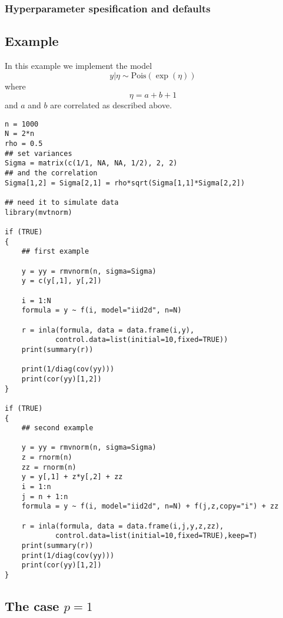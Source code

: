 \documentclass[a4paper,11pt]{article}
\begin{document}
\subsubsection*{Hyperparameter spesification and defaults}



\subsection*{Example}
In this example we implement the model
\begin{displaymath}
    y|\eta\sim\mbox{Pois}(\exp(\eta))
\end{displaymath}
where
\begin{displaymath}
    \eta=a+b+1
\end{displaymath}
and $a$ and $b$ are correlated as described above.

\begin{verbatim}
n = 1000
N = 2*n
rho = 0.5
## set variances
Sigma = matrix(c(1/1, NA, NA, 1/2), 2, 2)
## and the correlation
Sigma[1,2] = Sigma[2,1] = rho*sqrt(Sigma[1,1]*Sigma[2,2])

## need it to simulate data
library(mvtnorm)

if (TRUE)
{
    ## first example
    
    y = yy = rmvnorm(n, sigma=Sigma)
    y = c(y[,1], y[,2])

    i = 1:N
    formula = y ~ f(i, model="iid2d", n=N)

    r = inla(formula, data = data.frame(i,y),
            control.data=list(initial=10,fixed=TRUE))
    print(summary(r))

    print(1/diag(cov(yy)))
    print(cor(yy)[1,2])
}

if (TRUE)
{
    ## second example

    y = yy = rmvnorm(n, sigma=Sigma)
    z = rnorm(n)
    zz = rnorm(n)
    y = y[,1] + z*y[,2] + zz
    i = 1:n
    j = n + 1:n
    formula = y ~ f(i, model="iid2d", n=N) + f(j,z,copy="i") + zz 

    r = inla(formula, data = data.frame(i,j,y,z,zz),
            control.data=list(initial=10,fixed=TRUE),keep=T)
    print(summary(r))
    print(1/diag(cov(yy)))
    print(cor(yy)[1,2])
}
\end{verbatim}

\subsection*{The case $p=1$}
\end{document}
